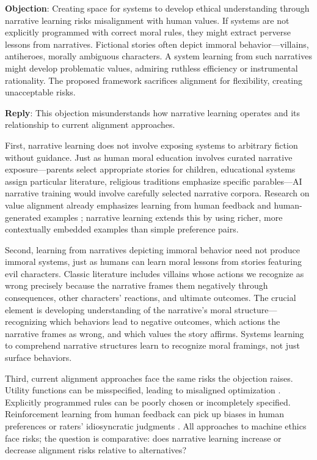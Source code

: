 \documentclass[12pt]{article}
\begin{document}
\textbf{Objection}: Creating space for systems to develop ethical understanding through narrative learning risks misalignment with human values. If systems are not explicitly programmed with correct moral rules, they might extract perverse lessons from narratives. Fictional stories often depict immoral behavior---villains, antiheroes, morally ambiguous characters. A system learning from such narratives might develop problematic values, admiring ruthless efficiency or instrumental rationality. The proposed framework sacrifices alignment for flexibility, creating unacceptable risks.

\textbf{Reply}: This objection misunderstands how narrative learning operates and its relationship to current alignment approaches.

First, narrative learning does not involve exposing systems to arbitrary fiction without guidance. Just as human moral education involves curated narrative exposure---parents select appropriate stories for children, educational systems assign particular literature, religious traditions emphasize specific parables---AI narrative training would involve carefully selected narrative corpora. Research on value alignment already emphasizes learning from human feedback and human-generated examples \citep{christiano2017deep, bai2022constitutional}; narrative learning extends this by using richer, more contextually embedded examples than simple preference pairs.

Second, learning from narratives depicting immoral behavior need not produce immoral systems, just as humans can learn moral lessons from stories featuring evil characters. Classic literature includes villains whose actions we recognize as wrong precisely because the narrative frames them negatively through consequences, other characters' reactions, and ultimate outcomes. The crucial element is developing understanding of the narrative's moral structure---recognizing which behaviors lead to negative outcomes, which actions the narrative frames as wrong, and which values the story affirms. Systems learning to comprehend narrative structures learn to recognize moral framings, not just surface behaviors.

Third, current alignment approaches face the same risks the objection raises. Utility functions can be misspecified, leading to misaligned optimization \citep{amodei2016concrete}. Explicitly programmed rules can be poorly chosen or incompletely specified. Reinforcement learning from human feedback can pick up biases in human preferences or raters' idiosyncratic judgments \citep{casper2023open}. All approaches to machine ethics face risks; the question is comparative: does narrative learning increase or decrease alignment risks relative to alternatives?
\end{document}
